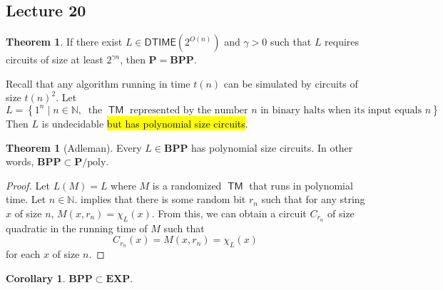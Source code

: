 \documentclass[10pt,letterpaper,cm]{nupset}
\theoremstyle{definition}
\theoremstyle{theorem}
\newtheorem{theorem}[definition]{Theorem}
\newtheorem{corollary}[definition]{Corollary}
\theoremstyle{remark}
\newcommand{\N}{\mathbb N}
\newcommand{\1}{\mathbf{1}}
\newcommand{\0}{\vec 0}
\DeclareMathOperator{\TM}{\mathsf{TM}}
\begin{document}
\subsection{Lecture 20}

\begin{theorem}
If there exist $L \in \mathsf{DTIME}\left(2^{O(n)}\right)$ and $\gamma >0$ such that $L$ requires circuits of size at least $2^{\gamma{n}}$, then $\mathbf{P} = \mathbf{BPP}$.
\end{theorem}

\smallskip

Recall that any algorithm running in time $t(n)$ can be simulated by circuits of size $t(n)^2$. Let $$L = \left\{ 1^n \mid n \in \N, \ \text{ the }\TM\text{ represented by the number }n\text{ in binary halts when its input equals }n\right\}.$$ Then $L$ is undecidable \hl{but has polynomial size circuits}. 

\smallskip

\begin{theorem}[Adleman]
Every $L\in \mathbf{BPP}$ has polynomial size circuits. In other words, $\mathbf{BPP} \subset \mathbf{P}/\mathrm{poly}$.
\end{theorem}
\begin{proof}
Let $L(M)  = L$ where $M$ is a randomized $\TM$ that runs in polynomial time. Let $n\in \N$.  implies that there is some random bit $r_n$ such that for any string $x$ of size $n$, $M(x,r_n) = \chi_L(x)$. From this, we can obtain a circuit $C_{r_n}$ of size quadratic in the running time of $M$ such that $$C_{r_n}(x) = M(x,{r_n}) = \chi_L(x)$$ for each $x$ of size $n$.
\end{proof}

\begin{corollary}
$\mathbf{BPP} \subset \mathbf{EXP}$.
\end{corollary}
\end{document}
